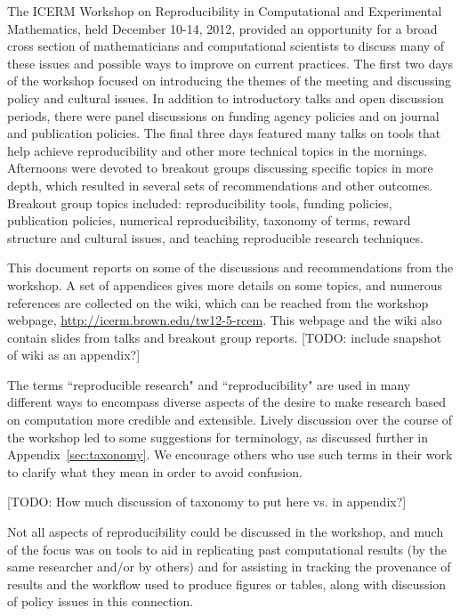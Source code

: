\documentclass[11pt]{article}
\newcommand{\todo}[1]{{\color{red} [TODO: #1]}}
\newcommand{\todo}[1]{}
\begin{document}
The ICERM Workshop on Reproducibility in Computational and Experimental
Mathematics, held December 10-14, 2012, provided an opportunity for
a broad cross section of mathematicians and computational scientists
to discuss many of these issues and possible ways to improve on
current practices.  The first two days of the workshop focused on
introducing the themes of the meeting and discussing policy and
cultural issues.  In addition to introductory talks and open
discussion periods, there were panel discussions on funding agency
policies and on journal and publication policies.  The final three
days featured many talks on tools that help achieve reproducibility
and other more technical topics in the mornings. Afternoons were
devoted to breakout groups discussing specific topics in more depth,
which resulted in several sets of recommendations and other outcomes.
Breakout group topics included: reproducibility tools, funding
policies, publication policies, numerical reproducibility, taxonomy
of terms, reward structure and cultural issues, and teaching
reproducible research techniques.

This document reports on some of the discussions and recommendations
from the workshop.
A set of appendices gives more details on some topics, and numerous
references are collected on the wiki, which can be reached from the workshop
webpage, \url{http://icerm.brown.edu/tw12-5-rcem}.  This webpage and the
wiki also contain slides from talks and breakout group reports.
\todo{include snapshot of wiki as an appendix?}

The terms ``reproducible research" and ``reproducibility" are used in many
different ways to encompass diverse aspects of the desire to make research
based on computation more credible and extensible.  Lively discussion over
the course of the workshop led to some suggestions for terminology, as
discussed further in Appendix~\ref{sec:taxonomy}.
We encourage others who use such
terms in their work to clarify what they mean in order to avoid confusion. 

\todo{How much discussion of taxonomy to put here vs. in appendix?}

Not all aspects of reproducibility could be discussed in the workshop,
and much of the focus was on tools to aid in replicating past
computational results (by the same researcher and/or by others) and
for assisting in tracking the provenance of results and the workflow
used to produce figures or tables, along with discussion of 
policy issues in this connection.  
\end{document}
